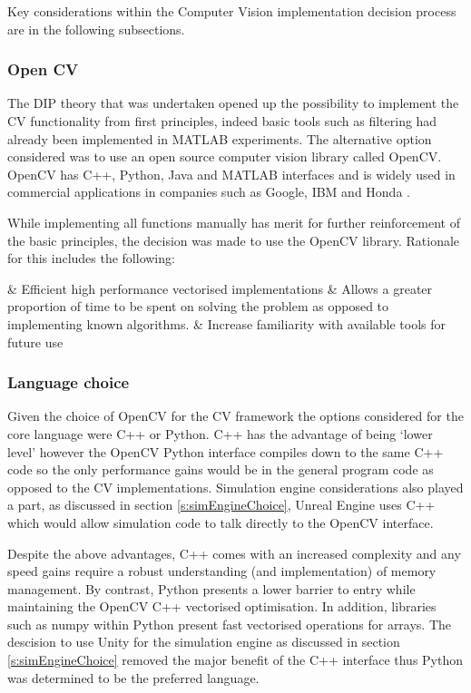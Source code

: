 \documentclass[]{aiaa-tc}%
\begin{document}
Key considerations within the Computer Vision implementation decision process are in the following subsections.

\subsubsection{Open CV}\label{s:openCV}

The DIP theory that was undertaken opened up the possibility to implement the CV functionality from first principles, indeed basic tools such as filtering had already been implemented in MATLAB experiments. The alternative option considered was to use an open source computer vision library called OpenCV. OpenCV has C++, Python, Java and MATLAB interfaces and is widely used in commercial applications in companies such as Google, IBM and Honda \citep{opencvWebsite}. 

While implementing all functions manually has merit for further reinforcement of the basic principles, the decision was made to use the OpenCV library. Rationale for this includes the following: 

\begin{easylist}
	& Efficient high performance vectorised implementations
	& Allows a greater proportion of time to be spent on solving the problem as opposed to implementing known algorithms.
	& Increase familiarity with available tools for future use
\end{easylist}

\subsubsection{Language choice} \label{s:pythonVc}

Given the choice of OpenCV for the CV framework the options considered for the core language were C++ or Python. C++ has the advantage of being `lower level' however the OpenCV Python interface compiles down to the same C++ code so the only performance gains would be in the general program code as opposed to the CV implementations. Simulation engine considerations also played a part, as discussed in section \ref{s:simEngineChoice}, Unreal Engine uses C++ which would allow simulation code to talk directly to the OpenCV interface.

Despite the above advantages, C++ comes with an increased complexity and any speed gains require a robust understanding (and implementation) of memory management. By contrast, Python presents a lower barrier to entry while maintaining the OpenCV C++ vectorised optimisation. In addition, libraries such as numpy within Python present fast vectorised operations for arrays. The descision to use Unity for the simulation engine as discussed in section \ref{s:simEngineChoice} removed the major benefit of the C++ interface thus Python was determined to be the preferred language.
\end{document}
